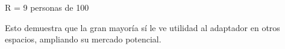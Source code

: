 R = 9 personas de 100

Esto demuestra que la gran mayoría sí le ve utilidad al adaptador en otros espacios, ampliando su mercado potencial.